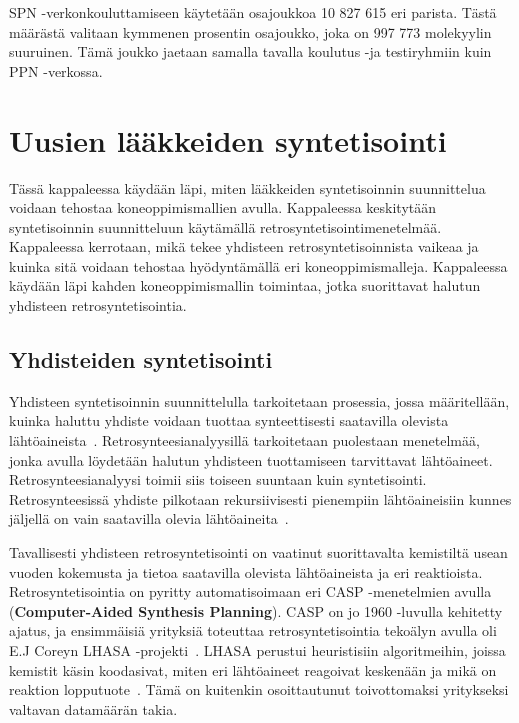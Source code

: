 \documentclass[finnish,twoside,censored,tkt,sw-line]{HYthesisML}
\begin{document}
SPN -verkonkouluttamiseen käytetään osajoukkoa 10 827 615 eri parista.
Tästä määrästä valitaan kymmenen prosentin osajoukko, joka on 997 773 molekyylin suuruinen.
Tämä joukko jaetaan samalla tavalla koulutus -ja testiryhmiin kuin PPN -verkossa.

\chapter{Uusien lääkkeiden syntetisointi}

Tässä kappaleessa käydään läpi, miten lääkkeiden syntetisoinnin suunnittelua voidaan tehostaa koneoppimismallien avulla.
Kappaleessa keskitytään syntetisoinnin suunnitteluun käytämällä retrosyntetisointimenetelmää.
Kappaleessa kerrotaan, mikä tekee yhdisteen retrosyntetisoinnista vaikeaa ja kuinka sitä voidaan tehostaa hyödyntämällä eri koneoppimismalleja.
Kappaleessa käydään läpi kahden koneoppimismallin toimintaa, jotka suorittavat halutun yhdisteen retrosyntetisointia.

\section{Yhdisteiden syntetisointi}

Yhdisteen syntetisoinnin suunnittelulla tarkoitetaan prosessia, jossa määritellään, kuinka haluttu yhdiste voidaan tuottaa synteettisesti saatavilla olevista lähtöaineista~\cite{ColeyConnorW2018MLiC}.
Retrosynteesianalyysillä tarkoitetaan puolestaan menetelmää, jonka avulla löydetään halutun yhdisteen tuottamiseen tarvittavat lähtöaineet.
Retrosynteesianalyysi toimii siis toiseen suuntaan kuin syntetisointi.
Retrosynteesissä yhdiste pilkotaan rekursiivisesti pienempiin lähtöaineisiin kunnes jäljellä on vain saatavilla olevia lähtöaineita~\cite{ECoreyRetrosynthesis}.

Tavallisesti yhdisteen retrosyntetisointi on vaatinut suorittavalta kemistiltä usean vuoden kokemusta ja tietoa saatavilla olevista lähtöaineista ja eri reaktioista.
Retrosyntetisointia on pyritty automatisoimaan eri CASP -menetelmien avulla (\textbf{Computer-Aided Synthesis Planning}).
CASP on jo 1960 -luvulla kehitetty ajatus, ja ensimmäisiä yrityksiä toteuttaa retrosyntetisointia tekoälyn avulla oli E.J Coreyn LHASA -projekti~\cite{ColeyConnorW2018MLiC}.
LHASA perustui heuristisiin algoritmeihin, joissa kemistit käsin koodasivat, miten eri lähtöaineet reagoivat keskenään ja mikä on reaktion lopputuote~\cite{LHASA}.
Tämä on kuitenkin osoittautunut toivottomaksi yritykseksi valtavan datamäärän takia.
\end{document}

